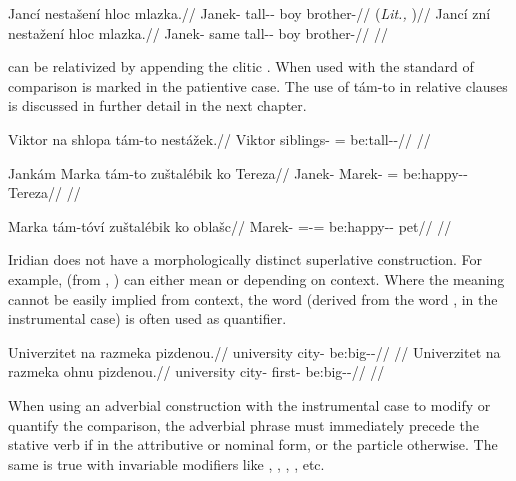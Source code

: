 \pex
\a
\begingl
\gla Jancí nestašení hloc mlazka.//
\glb Janek-\Gen{} tall-\Comp{}-\Att{} boy brother-\Dim{}//
\glft {} (\emph{Lit.,} )//
\endgl
\a
\begingl
\gla Jancí zní nestažení hloc mlazka.//
\glb Janek-\Gen{} same tall-\Comp{}-\Att{} boy brother-\Dim{}//
\glft {}//
\endgl
\xe

 can be relativized by appending the clitic .
When used with  the standard of comparison is marked in the
patientive case. The use of tám-to in relative clauses is
discussed in further detail in the next chapter.

\ex
\begingl
\gla Viktor na shlopa tám-to nestážek.//
\glb Viktor \Loc{} siblings-\Acc{} \Comp{}=\Rz{} be:tall-\Av{}-\Pf{}//
\glft {}//
\endgl
\xe

\ex
\begingl
\gla Jankám Marka tám-to zuštalébik ko Tereza//
\glb Janek-\Agt{} Marek-\Acc{} \Comp{}=\Rz{} be:happy-\Ben{}-\Pf{} \Lnk{} Tereza//
\glft {}//
\endgl
\xe

\ex
\begingl
\gla Marka tám-tóví zuštalébik ko oblašc//
\glb Marek-\Acc{} \Comp{}=\Rz{}-\Gen{}= be:happy-\Ben{}-\Pf{} \Lnk{} pet//
\glft {}//
\endgl
\xe

Iridian does not have a morphologically distinct superlative construction. For
example,  (from , ) can either mean
 or  depending on context. Where the meaning cannot
be easily implied from context, the word  (derived from the word
,  in the instrumental case) is often used as quantifier.

\pex
\a
\begingl
\gla Univerzitet na razmeka pizdenou.//
\glb university \Loc{} city-\Acc{} be:big-\Comp{}-\Nz{}//
\glft {}//
\endgl
\a
\begingl
\gla Univerzitet na razmeka ohnu pizdenou.//
\glb university \Loc{} city-\Acc{} first-\Ins{} be:big-\Comp{}-\Nz{}//
\glft {}//
\endgl
\xe

When using an adverbial construction with the instrumental case to modify or
quantify the comparison, the adverbial phrase must immediately precede the
stative verb if in the attributive or nominal form, or the particle 
otherwise. The same is true with invariable modifiers like ,
, , , etc.

